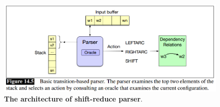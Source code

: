 \documentclass[11pt]{article}
\begin{document}
\begin{figure}
\begin{minipage}[t]{1\linewidth}
  \centering
  \centerline{\includegraphics[scale = 0.4]{shift_reduce_parse.png}}
\end{minipage}
\caption{\footnotesize{\textbf{The architecture of shift-reduce parser}.}}
\label{fig: shift_reduce_parse}
\end{figure}
\end{document}
